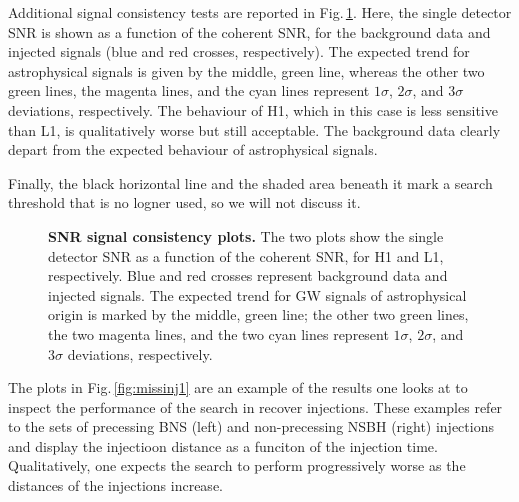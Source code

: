 \documentclass[binding=0.6cm, LaM]{sapthesis}
\begin{document}
	Additional signal consistency tests are reported in Fig.\,\ref{fig:detector1}. 
	Here, the single detector SNR is shown as a function of the coherent SNR, 
	for the background data and injected signals (blue and red crosses, respectively).
	The expected trend for astrophysical signals is given by the middle, green line, 
	whereas the other two green lines, the magenta lines, and the cyan lines represent $1\sigma$, $2\sigma$, 
	and $3\sigma$ deviations, respectively.
	The behaviour of H1, which in this case is less sensitive than L1, 
	is qualitatively worse but still acceptable.
	The background data clearly depart from the expected behaviour of astrophysical signals.
        
	Finally, the black horizontal line and the shaded area beneath it mark a search threshold 
	that is no logner used, so we will not discuss it.
        \begin{figure}[!t]
          \noindent
          \label{detector1}
          \centering
          \caption{\textbf{SNR signal consistency plots.} The two plots show the single detector SNR as a function of the coherent SNR, for H1 and L1, respectively.  Blue and red crosses represent background data and injected signals.  The expected trend for GW signals of astrophysical origin is marked by the middle, green line; the other two green lines, the two magenta lines, and the two cyan lines represent $1\sigma$, $2\sigma$, and $3\sigma$ deviations, respectively.}
          \label{fig:detector1}
        \end{figure}
	The plots in Fig.\,\ref{fig:missinj1} are an example of the results 
	one looks at to inspect the performance of the search in recover injections.
        These examples refer to the sets of precessing BNS (left) and non-precessing NSBH (right) 
	injections and display the injectioon distance as a funciton of the injection time.
	Qualitatively, one expects the search to perform progressively worse 
	as the distances of the injections increase. 
\end{document}
